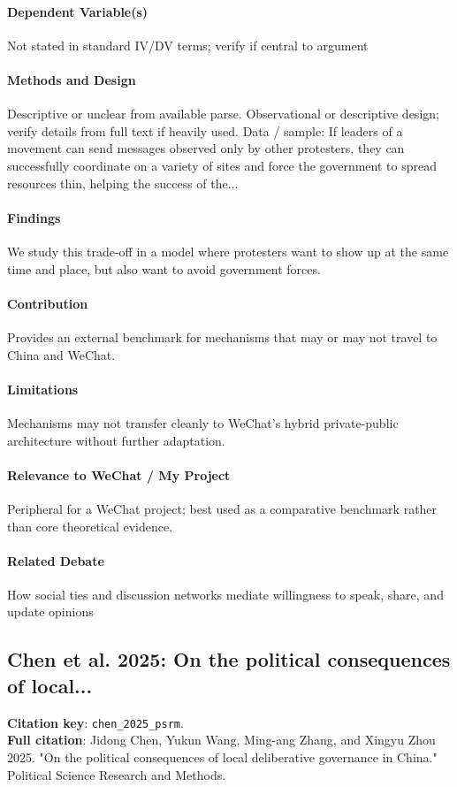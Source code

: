 \documentclass[12pt]{article}
\begin{document}
\paragraph{Dependent Variable(s)} Not stated in standard IV/DV terms; verify if central to argument

\paragraph{Methods and Design} Descriptive or unclear from available parse. Observational or descriptive design; verify details from full text if heavily used. Data / sample: If leaders of a movement can send messages observed only by other protesters, they can successfully coordinate on a variety of sites and force the government to spread resources thin, helping the success of the...

\paragraph{Findings} We study this trade-off in a model where protesters want to show up at the same time and place, but also want to avoid government forces.

\paragraph{Contribution} Provides an external benchmark for mechanisms that may or may not travel to China and WeChat.

\paragraph{Limitations} Mechanisms may not transfer cleanly to WeChat's hybrid private-public architecture without further adaptation.

\paragraph{Relevance to WeChat / My Project} Peripheral for a WeChat project; best used as a comparative benchmark rather than core theoretical evidence.

\paragraph{Related Debate} How social ties and discussion networks mediate willingness to speak, share, and update opinions


\subsection{Chen et al. 2025: On the political consequences of local...}
\textbf{Citation key}: \texttt{chen\_2025\_psrm}.\\
\textbf{Full citation}: Jidong Chen, Yukun Wang, Ming-ang Zhang, and Xingyu Zhou 2025. "On the political consequences of local deliberative governance in China." Political Science Research and Methods.
\end{document}
